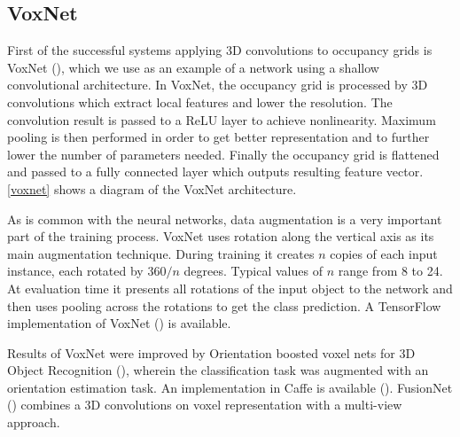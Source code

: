 \subsection{VoxNet}
First of the successful systems applying 3D convolutions to occupancy grids is VoxNet (\cite{maturana_voxnet:_2015}), which we use as an example of a network using a shallow convolutional architecture. 
In VoxNet, the occupancy grid is processed by 3D convolutions which extract local features and lower the resolution. The convolution result is passed to a ReLU layer to achieve nonlinearity. Maximum pooling is then performed in order to get better representation and to further lower the number of parameters needed. Finally the occupancy grid is flattened and passed to a fully connected layer which outputs resulting feature vector. \autoref{voxnet} shows a diagram of the VoxNet architecture.\par  
As is common with the neural networks, data augmentation is a very important part of the training process. VoxNet uses rotation along the vertical axis as its main augmentation technique. During training it creates $n$ copies of each input instance, each rotated by $360/n$ degrees. Typical values of $n$ range from 8 to 24. At evaluation time it presents all rotations of the input object to the network and then uses pooling across the rotations to get the class prediction. A TensorFlow implementation of VoxNet (\cite{maturana_voxnet_2016}) is available.\par
Results of VoxNet were improved by Orientation boosted voxel nets for 3D Object Recognition (\cite{sedaghat_orientation-boosted_2016}), wherein the classification task was augmented
with an orientation estimation task. An implementation in Caffe is available (\cite{sedaghat_orion_2016}). FusionNet (\cite{hegde_fusionnet:_2016}) combines a 3D convolutions on voxel representation with a multi-view approach.



